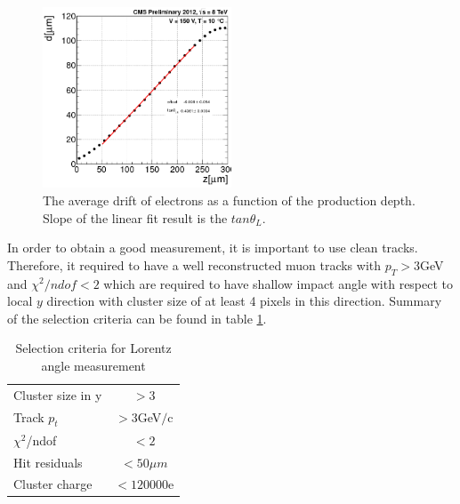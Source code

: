 \begin{figure}[ht!]
\centering
\includegraphics[width=0.5\textwidth]{Figures/LA2012_Profile.png}
\caption{The average drift of electrons as a function of the production depth. Slope of the linear fit result is the $tan \theta_L$.}
\label{fig:profile}
\end{figure}

In order to obtain a good measurement, it is important to use clean tracks. Therefore, it required to have a well reconstructed muon tracks with $p_T>3$GeV and $\chi^2/ndof<2$ which are required to have shallow impact angle with respect to local $y$ direction with cluster size of at least 4 pixels in this direction. Summary of the selection criteria can be found in table \ref{tab:sel}.

\begin{table}[ht!]
  \caption{Selection criteria for Lorentz angle measurement}
  \centering
  \begin{tabular}{l|c}
\hline
\hline
        Cluster size in y & $>3$  \\
	Track $p_t$ & $>3$GeV$/$c \\
	$\chi^2$/ndof & $<2$ \\
	Hit residuals & $<50\mu m$ \\
	Cluster charge & $<120000$e \\
\hline
\hline
  \end{tabular}
  \label{tab:sel}
\end{table}


